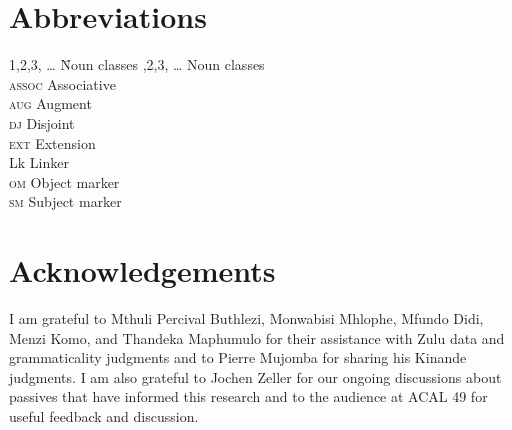 \documentclass[output=paper,colorlinks,citecolor=brown]{langscibook}
\begin{document}
\section*{Abbreviations}
\begin{multicols}{2}
\begin{tabbing}
    1,2,3, \ldots \hspace{1ex} \= Noun classes ,2,3, \ldots \> Noun classes \\
		\textsc{assoc} \> Associative \\
		\textsc{aug} \> Augment \\
		\textsc{dj} \> Disjoint\\
		\textsc{ext} \> Extension \\
		Lk \> Linker \\
		\textsc{om} \> Object marker \\
		\textsc{sm} \> Subject marker
\end{tabbing}
\end{multicols}

\section*{Acknowledgements}

I am grateful to Mthuli Percival Buthlezi, Monwabisi Mhlophe, Mfundo Didi, Menzi Komo, and Thandeka Maphumulo  for their assistance with Zulu data and grammaticality judgments and to Pierre Mujomba for sharing his Kinande judgments. I am also grateful to Jochen Zeller for our ongoing discussions about passives that have informed this research and to the audience at ACAL 49 for useful feedback and discussion.

{\sloppy\printbibliography[heading=subbibliography,notkeyword=this]}
\end{document}
